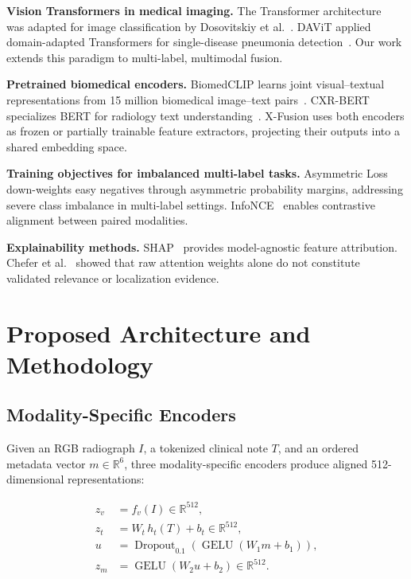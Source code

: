 \documentclass[runningheads,a4paper]{llncs}
\begin{document}
\textbf{Vision Transformers in medical imaging.}
The Transformer architecture~\cite{vaswani2017} was adapted for image classification by Dosovitskiy et al.~\cite{dosovitskiy2021}.
DAViT applied domain-adapted Transformers for single-disease pneumonia detection~\cite{davit2025}.
Our work extends this paradigm to multi-label, multimodal fusion.

\textbf{Pretrained biomedical encoders.}
BiomedCLIP learns joint visual--textual representations from 15 million biomedical image--text pairs~\cite{biomedclip2023}.
CXR-BERT specializes BERT for radiology text understanding~\cite{cxrbert2022}.
X-Fusion uses both encoders as frozen or partially trainable feature extractors, projecting their outputs into a shared embedding space.

\textbf{Training objectives for imbalanced multi-label tasks.}
Asymmetric Loss~\cite{ridnik2021} down-weights easy negatives through asymmetric probability margins, addressing severe class imbalance in multi-label settings.
InfoNCE~\cite{oord2018} enables contrastive alignment between paired modalities.

\textbf{Explainability methods.}
SHAP~\cite{lundberg2017} provides model-agnostic feature attribution.
Chefer et al.~\cite{chefer2021} showed that raw attention weights alone do not constitute validated relevance or localization evidence.

\section{Proposed Architecture and Methodology}

\subsection{Modality-Specific Encoders}

Given an RGB radiograph $I$, a tokenized clinical note $T$, and an ordered metadata vector $m\in\mathbb{R}^{6}$, three modality-specific encoders produce aligned 512-dimensional representations:

\begin{align}
z_v &= f_v(I)\in\mathbb{R}^{512},
\label{eq:vision}\\
z_t &= W_t\, h_t(T)+b_t\in\mathbb{R}^{512},
\label{eq:text}\\
u &= \operatorname{Dropout}_{0.1}
(\operatorname{GELU}(W_1 m+b_1)),
\label{eq:meta1}\\
z_m &= \operatorname{GELU}(W_2 u+b_2)
\in\mathbb{R}^{512}.
\label{eq:meta2}
\end{align}
\end{document}
